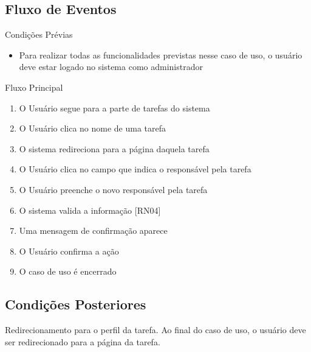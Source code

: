 \subsection{Fluxo de Eventos}

Condições Prévias
\begin{itemize}
  \item{Para realizar todas as funcionalidades previstas nesse caso de uso, o usuário deve estar logado no sistema como administrador}
\end{itemize}

Fluxo Principal
\begin{enumerate}
  \item{O Usuário segue para a parte de tarefas do sistema}
  \item{O Usuário clica no nome de uma tarefa}
  \item{O sistema redireciona para a página daquela tarefa}
  \item{O Usuário clica no campo que indica o responsável pela tarefa}
  \item{O Usuário preenche o novo responsável pela tarefa}
  \item{O sistema valida a informação [RN04]}
  \item{Uma mensagem de confirmação aparece}
  \item{O Usuário confirma a ação}
  \item{O caso de uso é encerrado}
\end{enumerate}


\subsection{Condições Posteriores}

Redirecionamento para o perfil da tarefa. Ao final do caso de uso, o usuário deve ser redirecionado para a página da tarefa.












